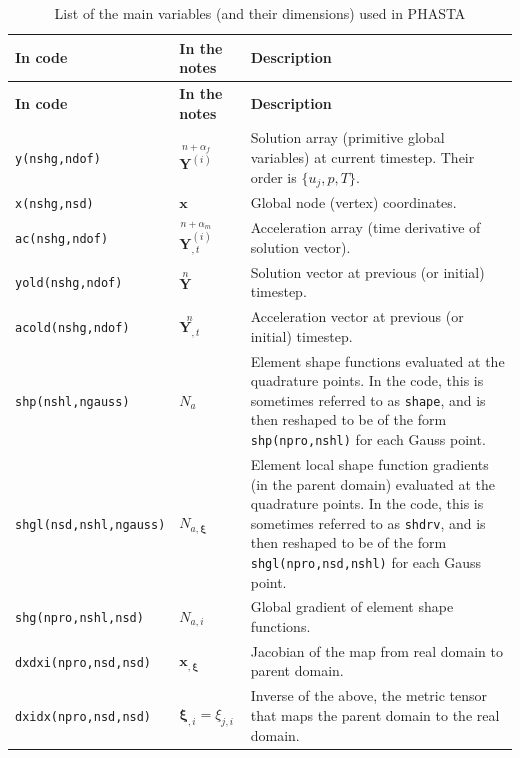 \documentclass{ucb}
\begin{document}
\begin{longtable}[c]{m{} m{} m{}}
    \caption{List of the main variables (and their dimensions) used in PHASTA}
    \label{tab:vars}
    \\
    
    \toprule
    \textbf{In code} & \textbf{In the notes} & \textbf{Description} \\
    \midrule
    \midrule
    \endfirsthead
    \toprule
    \textbf{In code} & \textbf{In the notes} & \textbf{Description} \\
    \midrule
    \midrule
    \endhead
    
    \texttt{y(nshg,ndof)} & $\overset{n+\alpha_f}{\bm{Y}^{(i)}}$ & Solution array (primitive global variables) at current timestep. Their order is $\{u_j, p, T\}$. \\
    \midrule
    \texttt{x(nshg,nsd)} & $\bm{x}$ & Global node (vertex) coordinates. \\
    \midrule
    \texttt{ac(nshg,ndof)} & $\overset{n+\alpha_m}{\bm{Y}_{,t}^{(i)}}$ & Acceleration array (time derivative of solution vector). \\
    \midrule
    \texttt{yold(nshg,ndof)} & $\overset{n}{\bm{Y}}$ & Solution vector at previous (or initial) timestep. \\
    \midrule
    \texttt{acold(nshg,ndof)} & $\overset{n}{\bm{Y}_{,t}}$ & Acceleration vector at previous (or initial) timestep. \\
    \midrule
    \texttt{shp(nshl,ngauss)} & $N_a$ & Element shape functions evaluated at the quadrature points. In the code, this is sometimes referred to as \texttt{shape}, and is then reshaped to be of the form \texttt{shp(npro,nshl)} for each Gauss point. \\
    \midrule
    \texttt{shgl(nsd,nshl,ngauss)} & $N_{a,\bm{\xi}}$ & Element local shape function gradients (in the parent domain) evaluated at the quadrature points. In the code, this is sometimes referred to as \texttt{shdrv}, and is then reshaped to be of the form \texttt{shgl(npro,nsd,nshl)} for each Gauss point. \\
    \midrule
    \texttt{shg(npro,nshl,nsd)} & $N_{a,i}$ & Global gradient of element shape functions. \\
    \midrule
    \texttt{dxdxi(npro,nsd,nsd)} & $\bm{x}_{,\bm{\xi}}$ & Jacobian of the map from real domain to parent domain. \\
    \midrule
    \texttt{dxidx(npro,nsd,nsd)} & $\bm{\xi}_{,i} = \xi_{j,i}$ & Inverse of the above, the metric tensor that maps the parent domain to the real domain. \\

\end{longtable}
\end{document}

